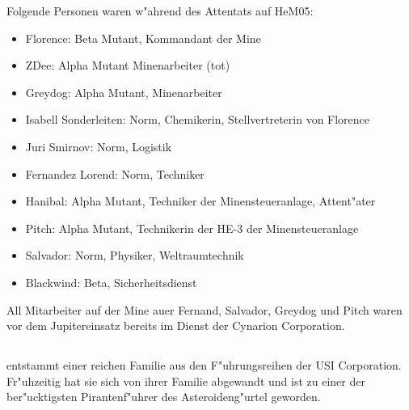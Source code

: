Folgende Personen waren w"ahrend des Attentats auf HeM05:

\begin{itemize}
    \item Florence: Beta Mutant, Kommandant der Mine
    \item ZDee: Alpha Mutant Minenarbeiter (tot)
    \item Greydog: Alpha Mutant, Minenarbeiter
    \item Isabell Sonderleiten: Norm, Chemikerin, Stellvertreterin von Florence
    \item Juri Smirnov: Norm, Logistik
    \item Fernandez Lorend: Norm, Techniker
    \item Hanibal: Alpha Mutant, Techniker der Minensteueranlage, Attent"ater
    \item Pitch: Alpha Mutant, Technikerin der HE-3 der Minensteueranlage
    \item Salvador: Norm, Physiker, Weltraumtechnik
    \item Blackwind: Beta, Sicherheitsdienst
\end{itemize}

All Mitarbeiter auf der Mine au\3er Fernand, Salvador, Greydog und Pitch waren vor dem Jupitereinsatz bereits im Dienst der Cynarion Corporation.

\subsection[\pinyin{Wang Xiao Long}]{  }

   entstammt einer reichen Familie aus den F"uhrungsreihen der USI Corporation. Fr"uhzeitig hat sie sich von ihrer Familie abgewandt und ist zu einer der ber"ucktigsten Pirantenf"uhrer des Asteroideng"urtel geworden. 

